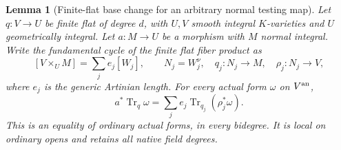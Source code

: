\documentclass[11pt,a4paper]{article}
\newtheorem{lemma}[theorem]{Lemma}
\theoremstyle{definition}
\theoremstyle{remark}
\numberwithin{equation}{section}
\begin{document}
\begin{lemma}[Finite-flat base change for an arbitrary normal testing map]
\label{r16h:finite-base-change}
Let $q:V\to U$ be finite flat of degree $d$, with $U,V$ smooth integral
$K$-varieties and $U$ geometrically integral. Let $a:M\to U$ be a
morphism with $M$ normal integral. Write the fundamental cycle of the
finite flat fiber product as
\[
 [V\times_U M]=\sum_j e_j[W_j],
 \qquad N_j=W_j^\nu,\quad q_j:N_j\to M,\quad \rho_j:N_j\to V,
\]
where $e_j$ is the generic Artinian length. For every actual form $\omega$
on $V^{\rm an}$,
\[
 a^*\operatorname{Tr}_q\omega
   =\sum_j e_j\operatorname{Tr}_{q_j}(\rho_j^*\omega).
 \tag{H16.1}\label{r16h:base-change}
\]
This is an equality of ordinary actual forms, in every bidegree. It is
local on ordinary opens and retains all native field degrees.
\end{lemma}
\end{document}
